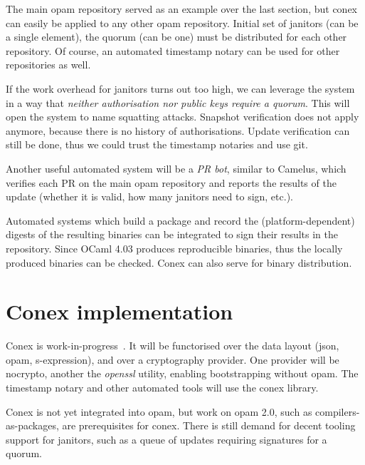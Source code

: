 \documentclass[nocopyrightspace]{sigplanconf}
\newcommand{\TODO}[1]{\textbf{[TODO: #1]}}
\begin{document}
The main opam repository served as an example over the last section, but conex can easily be applied to any other opam repository.
Initial set of janitors (can be a single element), the quorum (can be one) must be distributed for each other repository.
Of course, an automated timestamp notary can be used for other repositories as well.

If the work overhead for janitors turns out too high, we can leverage the system in a way that \emph{neither authorisation nor public keys require a quorum}.
This will open the system to name squatting attacks.
Snapshot verification does not apply anymore, because there is no history of authorisations.
Update verification can still be done, thus we could trust the timestamp notaries and use git.


Another useful automated system will be a \emph{PR bot}, similar to Camelus, which verifies each PR on the main opam repository and reports the results of the update (whether it is valid, how many janitors need to sign, etc.).

Automated systems which build a package and record the (platform-dependent) digests of the resulting binaries can be integrated to sign their results in the repository.
Since OCaml 4.03 produces reproducible binaries, thus the locally produced binaries can be checked.
Conex can also serve for binary distribution.

\section{Conex implementation} \label{sec:implementation}

Conex is work-in-progress~\cite{conex}.
It will be functorised over the data layout (json, opam, s-expression), and over a cryptography provider.
One provider will be nocrypto, another the \emph{openssl} utility, enabling bootstrapping without opam.
The timestamp notary and other automated tools will use the conex library.

Conex is not yet integrated into opam, but work on opam 2.0, such as compilers-as-packages, are prerequisites for conex.
There is still demand for decent tooling support for janitors, such as a queue of updates requiring signatures for a quorum.
\end{document}

